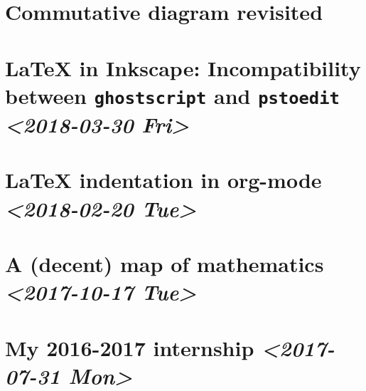 \documentclass[11pt]{article}
\begin{document}
\section{Commutative diagram revisited}
\label{sec:orgc61064e}

\section{\LaTeX{} in Inkscape: Incompatibility between \texttt{ghostscript} and \texttt{pstoedit} \textit{<2018-03-30 Fri>}}
\label{sec:org9453df4}

\section{\LaTeX{} indentation in org-mode \textit{<2018-02-20 Tue>}}
\label{sec:org25f6eb5}

\section{A (decent) map of mathematics \textit{<2017-10-17 Tue>}}
\label{sec:org4446147}

\section{My 2016-2017 internship \textit{<2017-07-31 Mon>}}
\label{sec:orgd335b8a}
\end{document}
